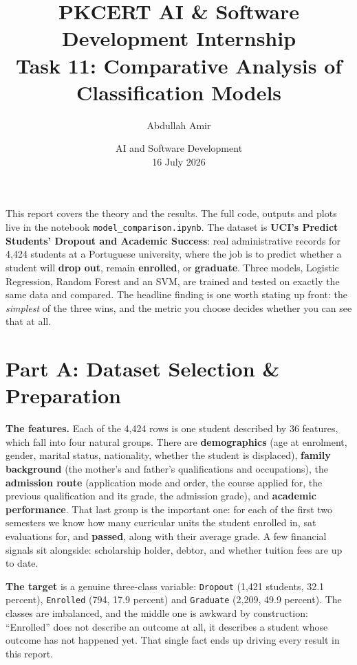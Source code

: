\documentclass[11pt,a4paper]{article}
\title{\vspace{-1.5cm}\textbf{PKCERT AI \& Software Development Internship \\ Task 11: Comparative Analysis of Classification Models}}
\author{Abdullah Amir}
\date{AI and Software Development \\ 16 July 2026}
\begin{document}
\maketitle
\vspace{-0.8cm}

This report covers the theory and the results. The full code, outputs and plots live in
the notebook \texttt{model\_comparison.ipynb}. The dataset is \textbf{UCI's Predict
Students' Dropout and Academic Success}: real administrative records for 4,424 students
at a Portuguese university, where the job is to predict whether a student will
\textbf{drop out}, remain \textbf{enrolled}, or \textbf{graduate}. Three models,
Logistic Regression, Random Forest and an SVM, are trained and tested on exactly the
same data and compared. The headline finding is one worth stating up front: the
\emph{simplest} of the three wins, and the metric you choose decides whether you can
see that at all.

\section*{Part A: Dataset Selection \& Preparation}

\textbf{The features.} Each of the 4,424 rows is one student described by 36 features,
which fall into four natural groups. There are \textbf{demographics} (age at enrolment,
gender, marital status, nationality, whether the student is displaced),
\textbf{family background} (the mother's and father's qualifications and occupations),
the \textbf{admission route} (application mode and order, the course applied for, the
previous qualification and its grade, the admission grade), and
\textbf{academic performance}. That last group is the important one: for each of the
first two semesters we know how many curricular units the student enrolled in, sat
evaluations for, and \textbf{passed}, along with their average grade. A few financial
signals sit alongside: scholarship holder, debtor, and whether tuition fees are up to
date.

\textbf{The target} is a genuine three-class variable: \texttt{Dropout} (1,421 students,
32.1 percent), \texttt{Enrolled} (794, 17.9 percent) and \texttt{Graduate} (2,209, 49.9
percent). The classes are imbalanced, and the middle one is awkward by construction:
``Enrolled'' does not describe an outcome at all, it describes a student whose outcome
has not happened yet. That single fact ends up driving every result in this report.
\end{document}
